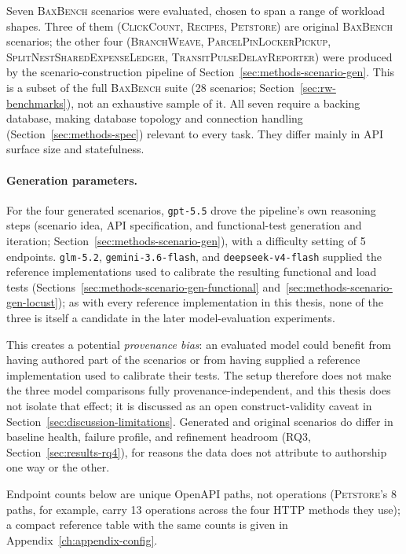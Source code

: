 Seven \textsc{BaxBench} scenarios were evaluated, chosen to span a range of
workload shapes. Three of them (\textsc{ClickCount}, \textsc{Recipes},
\textsc{Petstore}) are original \textsc{BaxBench} scenarios; the other four
(\textsc{BranchWeave}, \textsc{ParcelPinLockerPickup},
\textsc{SplitNestSharedExpenseLedger}, \textsc{TransitPulseDelayReporter})
were produced by the scenario-construction pipeline of
Section~\ref{sec:methods-scenario-gen}. This is a subset of the full
\textsc{BaxBench} suite (28 scenarios; Section~\ref{sec:rw-benchmarks}),
not an exhaustive sample of it. All seven require a backing database,
making database topology and connection handling
(Section~\ref{sec:methods-spec}) relevant to every task. They differ
mainly in API surface size and statefulness.

\paragraph{Generation parameters.} For the four generated scenarios,
\texttt{gpt-5.5} drove the pipeline's own reasoning steps (scenario idea,
API specification, and functional-test generation and iteration;
Section~\ref{sec:methods-scenario-gen}), with a difficulty setting of 5
endpoints. \texttt{glm-5.2}, \texttt{gemini-3.6-flash}, and
\texttt{deepseek-v4-flash} supplied the reference implementations used to
calibrate the resulting functional and load tests
(Sections~\ref{sec:methods-scenario-gen-functional}
and~\ref{sec:methods-scenario-gen-locust}); as with every reference
implementation in this thesis, none of the three is itself a candidate in
the later model-evaluation experiments.

This creates a potential \emph{provenance bias}: an evaluated model could
benefit from having authored part of the scenarios or from having supplied a
reference implementation used to calibrate their tests. The setup therefore
does not make the three model comparisons fully provenance-independent, and
this thesis does not isolate that effect; it is discussed as an open
construct-validity caveat in Section~\ref{sec:discussion-limitations}.
Generated and original scenarios do differ in baseline health, failure
profile, and refinement headroom (RQ3, Section~\ref{sec:results-rq4}), for
reasons the data does not attribute to authorship one way or the other.

Endpoint counts below are unique OpenAPI paths, not operations
(\textsc{Petstore}'s 8 paths, for example, carry 13 operations across the
four HTTP methods they use); a compact reference table with the same
counts is given in Appendix~\ref{ch:appendix-config}.

